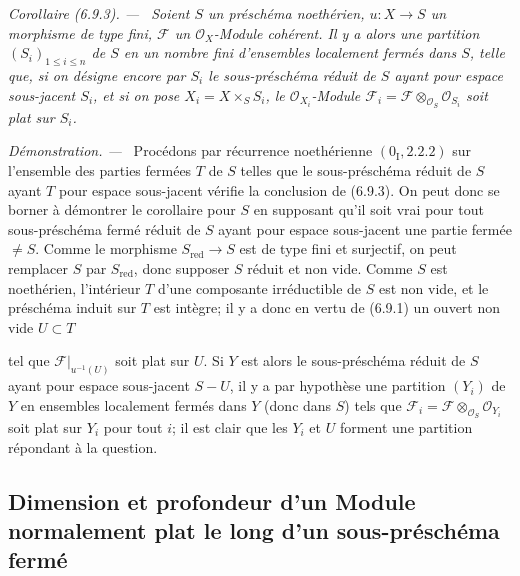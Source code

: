 \documentclass[10pt,oneside]{book}
\newcommand{\oldpage}[2][]{%
  \setcounter{footnote}{0}%
  \marginpar{\scriptsize\textbf{#1}~|~#2}\ignorespaces}
\newenvironment{corollary}[1][]{%
  \par\medskip\noindent\itshape Corollaire (#1). ---\ }{\par}
\newenvironment{proof}{%
  \par\medskip\noindent\textit{Démonstration. ---\ }}{\par}
\begin{document}
\begin{corollary}[6.9.3]
\label{IV.2.s6.9.3-fr}
Soient $S$ un préschéma noethérien, $u:X\to S$ un morphisme de type fini,
$\mathcal F$ un $\mathcal O_X$-Module cohérent. Il y a alors une partition
$(S_i)_{1\leq i\leq n}$ de $S$ en un nombre fini d'ensembles localement fermés
dans $S$, telle que, si on désigne encore par $S_i$ le sous-préschéma réduit
de $S$ ayant pour espace sous-jacent $S_i$, et si on pose
$X_i=X\times_S S_i$, le $\mathcal O_{X_i}$-Module
$\mathcal F_i=\mathcal F\otimes_{\mathcal O_S}\mathcal O_{S_i}$ soit plat
sur $S_i$.
\end{corollary}

\begin{proof}
Procédons par récurrence noethérienne $(0_{\mathrm I},2.2.2)$ sur l'ensemble
des parties fermées $T$ de $S$ telles que le sous-préschéma réduit de $S$
ayant $T$ pour espace sous-jacent vérifie la conclusion de (6.9.3). On peut
donc se borner à démontrer le corollaire pour $S$ en supposant qu'il soit vrai
pour tout sous-préschéma fermé réduit de $S$ ayant pour espace sous-jacent une
partie fermée $\ne S$. Comme le morphisme $S_{\mathrm{red}}\to S$ est de type
fini et surjectif, on peut remplacer $S$ par $S_{\mathrm{red}}$, donc supposer
$S$ réduit et non vide. Comme $S$ est noethérien, l'intérieur $T$ d'une
composante irréductible de $S$ est non vide, et le préschéma induit sur $T$
est intègre; il y a donc en vertu de (6.9.1) un ouvert non vide $U\subset T$

\oldpage[IV-2]{155}

tel que $\mathcal F|_{u^{-1}(U)}$ soit plat sur $U$. Si $Y$ est alors le
sous-préschéma réduit de $S$ ayant pour espace sous-jacent $S-U$, il y a par
hypothèse une partition $(Y_i)$ de $Y$ en ensembles localement fermés dans
$Y$ (donc dans $S$) tels que
$\mathcal F_i=\mathcal F\otimes_{\mathcal O_S}\mathcal O_{Y_i}$ soit plat
sur $Y_i$ pour tout $i$; il est clair que les $Y_i$ et $U$ forment une
partition répondant à la question.
\end{proof}

\subsection{Dimension et profondeur d'un Module normalement plat le long d'un
sous-préschéma fermé}
\label{subsection:IV.6.10}
\end{document}
